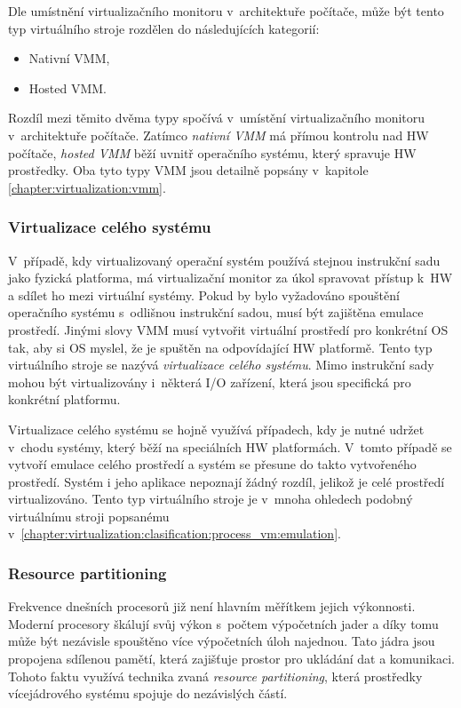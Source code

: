 Dle umístnění virtualizačního monitoru v~architektuře počítače, může být tento typ virtuálního stroje rozdělen do následujících kategorií:  
\begin{itemize}
  \item Nativní VMM,
  \item Hosted VMM.
\end{itemize}
Rozdíl mezi těmito dvěma typy spočívá v~umístění virtualizačního monitoru v~architektuře počítače. Zatímco 
\textit{nativní VMM} má přímou kontrolu nad HW počítače, \textit{hosted VMM} běží uvnitř operačního systému, který spravuje
HW prostředky. Oba tyto typy VMM jsou detailně popsány v~kapitole \ref{chapter:virtualization:vmm}.   
\subsubsection{Virtualizace celého systému}
\label{chapter:virtualization:clasification:system_vm:whole_system_virtualization}
V~případě, kdy virtualizovaný operační systém používá stejnou instrukční sadu jako fyzická platforma, má virtualizační monitor
za úkol spravovat přístup k~HW a sdílet ho mezi virtuální systémy. Pokud by bylo vyžadováno spouštění operačního systému
s~odlišnou instrukční sadou, musí být zajištěna emulace prostředí. Jinými slovy VMM musí vytvořit virtuální prostředí pro
konkrétní OS tak, aby si OS myslel, že je spuštěn na odpovídající HW platformě. Tento typ virtuálního stroje se nazývá
\textit{virtualizace celého systému}. Mimo instrukční sady mohou být virtualizovány i~některá I/O zařízení, která jsou
specifická pro konkrétní platformu.

Virtualizace celého systému se hojně využívá případech, kdy je nutné udržet v~chodu systémy, který běží na speciálních HW platformách.
V~tomto případě se vytvoří emulace celého prostředí a systém se přesune do takto vytvořeného prostředí. Systém i jeho aplikace
nepoznají žádný rozdíl, jelikož je celé prostředí virtualizováno. Tento typ virtuálního stroje je v~mnoha ohledech podobný
virtuálnímu stroji popsanému v~\ref{chapter:virtualization:clasification:process_vm:emulation}.
\subsubsection{Resource partitioning}
\label{chapter:virtualization:clasification:system_vm:partitioning}
Frekvence dnešních procesorů již není hlavním měřítkem jejich výkonnosti. Moderní procesory škálují svůj
výkon s~počtem výpočetních jader a díky tomu může být nezávisle spouštěno více výpočetních úloh najednou. Tato jádra jsou 
propojena sdílenou pamětí, která zajišťuje prostor pro ukládání dat a komunikaci. Tohoto faktu využívá technika zvaná 
\textit{resource partitioning}, která prostředky vícejádrového systému spojuje do nezávislých částí.

